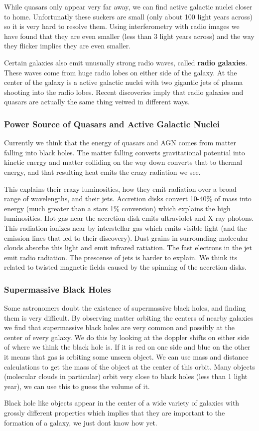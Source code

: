 While quasars only appear very far away, we can find active galactic nuclei closer to home. Unfortunatly these suckers are small (only about 100 light years across) so it is very hard to resolve them. Using interferometry with radio images we have found that they are even smaller (less than 3 light years across) and the way they flicker implies they are even smaller.

Certain galaxies also emit unusually strong radio waves, called \textbf{radio galaxies}. These waves come from huge radio lobes on either side of the galaxy. At the center of the galaxy is a active galactic nuclei with two gigantic jets of plasma shooting into the radio lobes. Recent discoveries imply that radio galaxies and quasars are actually the same thing veiwed in different ways.

\subsubsection{Power Source of Quasars and Active Galactic Nuclei}
Currently we think that the energy of quasars and AGN comes from matter falling into black holes. The matter falling converts gravitational potential into kinetic energy and matter colliding on the way down converts that to thermal energy, and that resulting heat emits the crazy radiation we see.

This explains their crazy luminosities, how they emit radiation over a broad range of wavelengths, and their jets. Accretion disks convert 10-40\% of mass into energy (much greater than a stars 1\% conversion) which explains the high luminosities. Hot gas near the accretion disk emits ultraviolet and X-ray photons. This radiation ionizes near by interstellar gas which emits visible light (and the emission lines that led to their discovery). Dust grains in surrounding molecular clouds absorbe this light and emit infrared ratiation. The fast electrons in the jet emit radio radiation. The prescense of jets is harder to explain. We think its related to twisted magnetic fields caused by the spinning of the accretion disks.

\subsubsection{Supermassive Black Holes}
Some astronomers doubt the existence of supermassive black holes, and finding them is very difficult. By observing matter orbiting the centers of nearby galaxies we find that supermassive black holes are very common and possibly at the center of every galaxy. We do this by looking at the doppler shifts on either side of where we think the black hole is. If it is red on one side and blue on the other it means that gas is orbiting some unseen object. We can use mass and distance calculations to get the mass of the object at the center of this orbit. Many objects (molecular clouds in particular) orbit very close to black holes (less than 1 light year), we can use this to guess the volume of it.

Black hole like objects appear in the center of a wide variety of galaxies with grossly different properties which implies that they are important to the formation of a galaxy, we just dont know how yet.
